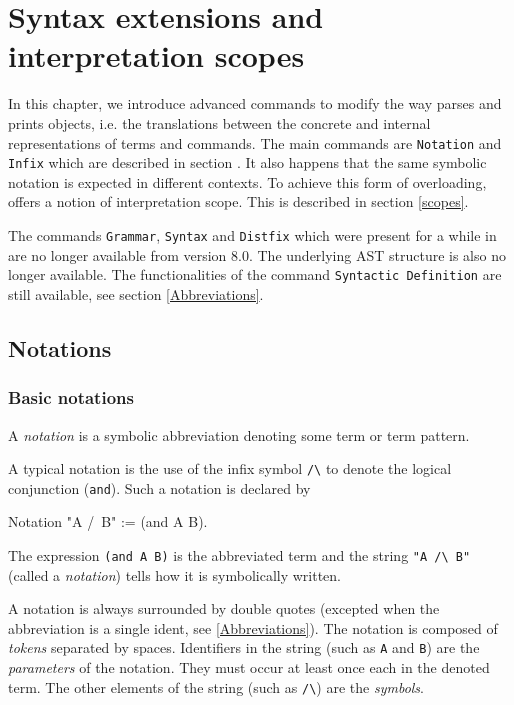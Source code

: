 \chapter{Syntax extensions and interpretation scopes}
\label{Addoc-syntax}

In this chapter, we introduce advanced commands to modify the way
{\Coq} parses and prints objects, i.e. the translations between the
concrete and internal representations of terms and commands. The main
commands are {\tt Notation} and {\tt Infix} which are described in
section \label{Notation}.  It also happens that the same symbolic
notation is expected in different contexts. To achieve this form of
overloading, {\Coq} offers a notion of interpretation scope. This is
described in section \ref{scopes}.

\Rem The commands {\tt Grammar}, {\tt Syntax} and {\tt Distfix} which
were present for a while in {\Coq} are no longer available from {\Coq}
version 8.0. The underlying AST structure is also no longer available.
The functionalities of the command {\tt Syntactic Definition} are
still available, see section \ref{Abbreviations}.

\section{Notations}
\label{Notation}

\subsection{Basic notations}

A {\em notation} is a symbolic abbreviation denoting some term
or term pattern.

A typical notation is the use of the infix symbol \verb=/\= to denote
the logical conjunction (\texttt{and}). Such a notation is declared
by

\begin{coq_example*}
Notation "A /\ B" := (and A B).
\end{coq_example*}

The expression \texttt{(and A B)} is the abbreviated term and the
string \verb="A /\ B"= (called a {\em notation}) tells how it is 
symbolically written.

A notation is always surrounded by double quotes (excepted when the
abbreviation is a single ident, see \ref{Abbreviations}). The
notation is composed of {\em tokens} separated by spaces.  Identifiers
in the string (such as \texttt{A} and \texttt{B}) are the {\em
parameters} of the notation. They must occur at least once each in the
denoted term. The other elements of the string (such as \verb=/\=) are
the {\em symbols}.

